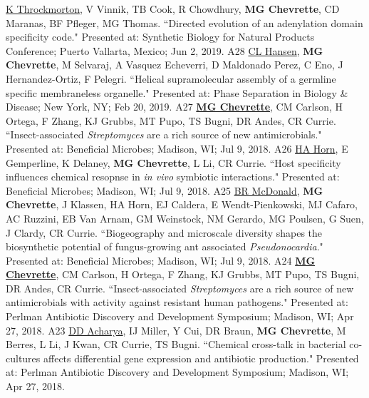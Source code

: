 
\begin{cvpubs}
  \cvpub
    {\underline{K Throckmorton}, V Vinnik, TB Cook, R Chowdhury, \textbf{MG Chevrette}, CD Maranas, BF Pfleger, MG Thomas. ``Directed evolution of an adenylation domain specificity code." Presented at: Synthetic Biology for Natural Products Conference; Puerto Vallarta, Mexico; Jun 2, 2019.} %
    {A28} %
  \cvpub
    {\underline{CL Hansen}, \textbf{MG Chevrette}, M Selvaraj, A Vasquez Echeverri, D Maldonado Perez, C Eno, J Hernandez-Ortiz, F Pelegri. ``Helical supramolecular assembly of a germline specific membraneless organelle." Presented at: Phase Separation in Biology \& Disease; New York, NY; Feb 20, 2019.} %
    {A27} %
  \cvpub
    {\underline{\textbf{MG Chevrette}}, CM Carlson, H Ortega, F Zhang, KJ Grubbs, MT Pupo, TS Bugni, DR Andes, CR Currie. ``Insect-associated \textit{Streptomyces} are a rich source of new antimicrobials." Presented at: Beneficial Microbes; Madison, WI; Jul 9, 2018.} %
    {A26} %
  \cvpub
    {\underline{HA Horn}, E Gemperline, K Delaney, \textbf{MG Chevrette}, L Li, CR Currie. ``Host specificity influences chemical resopnse in \textit{in vivo} symbiotic interactions." Presented at: Beneficial Microbes; Madison, WI; Jul 9, 2018.} %
    {A25} %
  \cvpub
    {\underline{BR McDonald}, \textbf{MG Chevrette}, J Klassen, HA Horn, EJ Caldera, E Wendt-Pienkowski, MJ Cafaro, AC Ruzzini, EB Van Arnam, GM Weinstock, NM Gerardo, MG Poulsen, G Suen, J Clardy, CR Currie. ``Biogeography and microscale diversity shapes the biosynthetic potential of fungus-growing ant associated \textit{Pseudonocardia}." Presented at: Beneficial Microbes; Madison, WI; Jul 9, 2018.} %
    {A24} %
  \cvpub
    {\underline{\textbf{MG Chevrette}}, CM Carlson, H Ortega, F Zhang, KJ Grubbs, MT Pupo, TS Bugni, DR Andes, CR Currie. ``Insect-associated \textit{Streptomyces} are a rich source of new antimicrobials with activity against resistant human pathogens." Presented at: Perlman Antibiotic Discovery and Development Symposium; Madison, WI; Apr 27, 2018.} %
    {A23} %
  \cvpub
    {\underline{DD Acharya}, IJ Miller, Y Cui, DR Braun, \textbf{MG Chevrette}, M Berres, L Li, J Kwan, CR Currie, TS Bugni. ``Chemical cross-talk in bacterial co-cultures affects differential gene expression and antibiotic production." Presented at: Perlman Antibiotic Discovery and Development Symposium; Madison, WI; Apr 27, 2018.} %

\end{cvpubs}
